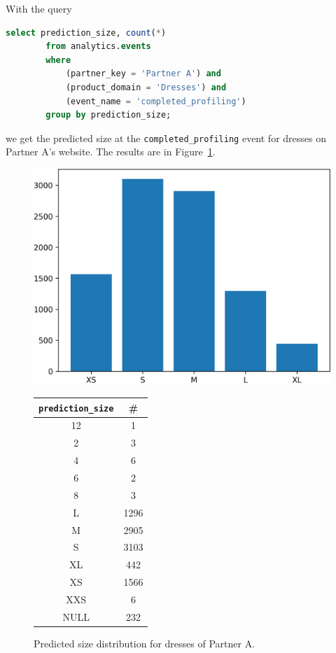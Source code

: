 \documentclass[12pt,a4paper]{article}
\begin{document}
    With the query
    \begin{lstlisting}[language=SQL]
        select prediction_size, count(*) 
        from analytics.events 
        where 
            (partner_key = 'Partner A') and 
            (product_domain = 'Dresses') and 
            (event_name = 'completed_profiling') 
        group by prediction_size;
    \end{lstlisting}
    we get 
    the predicted size 
    at
    the \verb|completed_profiling| event
    for dresses on Partner A's website.
    The results are in 
    Figure~\ref{f:pred_sz}.
    
    
    \begin{figure}[h]
        \qquad
        \begin{minipage}{0.55\textwidth}
            \includegraphics[width=\textwidth]{../py/OUTPUT/histo/img/histo.png}
        \end{minipage}
        \hfill
        \begin{minipage}{0.3\textwidth}
            \small
            \begin{tabular}{c|c}
                \verb|prediction_size| & \# \\
                \hline
                12  & 1    \\
                2   & 3    \\
                4   & 6    \\
                6   & 2    \\
                8   & 3    \\
                L   & 1296 \\
                M   & 2905 \\
                S   & 3103 \\
                XL  & 442  \\
                XS  & 1566 \\
                XXS & 6    \\
                NULL & 232 
            \end{tabular}
        \end{minipage}
        \qquad
        
        \caption{Predicted size distribution for dresses of Partner A.}
        \label{f:pred_sz}
    \end{figure}
    
\end{document}

